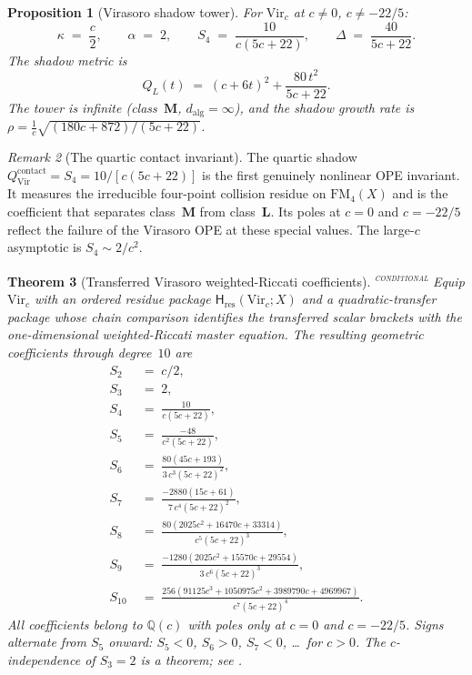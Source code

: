 \documentclass[11pt,reqno]{amsart}
\newtheorem{theorem}{Theorem}[section]
\newtheorem{proposition}[theorem]{Proposition}
\theoremstyle{definition}
\theoremstyle{remark}
\newtheorem{remark}[theorem]{Remark}
\newcommand{\FM}{\mathrm{FM}}
\newcommand{\Vir}{\mathrm{Vir}}
\providecommand{\ClaimStatusConditional}{\textsuperscript{\textsc{conditional}}}
\numberwithin{equation}{section}
\begin{document}
\begin{proposition}[Virasoro shadow
tower]\label{prop:virasoro}
For $\Vir_c$ at $c \ne 0$, $c \ne -22/5$:
\[
 \kappa \;=\; \frac{c}{2},
 \qquad
 \alpha \;=\; 2,
 \qquad
 S_4 \;=\; \frac{10}{c(5c+22)},
 \qquad
 \Delta \;=\; \frac{40}{5c+22}.
\]
The shadow metric is
\[
 Q_L(t)
 \;=\;
 (c + 6t)^2 + \frac{80\, t^2}{5c + 22}.
\]
The tower is infinite (class~$\mathbf{M}$,
$d_{\mathrm{alg}} = \infty$), and the shadow growth rate is
$\rho = \frac{1}{c}\sqrt{(180c + 872)/(5c+22)}$.
\end{proposition}

\begin{remark}[The quartic contact
invariant]\label{rem:quartic-contact}
The quartic shadow
$Q^{\mathrm{contact}}_{\Vir} = S_4 = 10/[c(5c+22)]$ is
the first genuinely nonlinear OPE invariant. It measures
the irreducible four-point collision residue on $\FM_4(X)$
and is the coefficient that separates class~$\mathbf{M}$
from class~$\mathbf{L}$. Its poles at $c = 0$ and
$c = -22/5$ reflect the failure of the Virasoro OPE at
these special values. The large-$c$ asymptotic is
$S_4 \sim 2/c^2$.
\end{remark}

\begin{theorem}[Transferred Virasoro weighted-Riccati
coefficients]\label{thm:virasoro-coefficients}
\ClaimStatusConditional
Equip $\Vir_c$ with an ordered residue package
$\mathsf H_{\mathrm{res}}(\Vir_c;X)$ and a quadratic-transfer package
whose chain comparison identifies the transferred scalar brackets with
the one-dimensional weighted-Riccati master equation.  The resulting
geometric coefficients through degree~$10$ are
\begin{align*}
 S_2 &\;=\; c/2, \\[3pt]
 S_3 &\;=\; 2, \\[3pt]
 S_4 &\;=\; \frac{10}{c(5c+22)}, \\[3pt]
 S_5 &\;=\; \frac{-48}{c^2(5c+22)}, \\[3pt]
 S_6 &\;=\; \frac{80(45c+193)}{3\,c^3(5c+22)^2}, \\[3pt]
 S_7 &\;=\;
 \frac{-2880(15c+61)}{7\,c^4(5c+22)^2}, \\[3pt]
 S_8 &\;=\;
 \frac{80(2025c^2+16470c+33314)}{c^5(5c+22)^3}, \\[3pt]
 S_9 &\;=\;
 \frac{-1280(2025c^2+15570c+29554)}
 {3\,c^6(5c+22)^3}, \\[3pt]
 S_{10} &\;=\;
 \frac{256(91125c^3+1050975c^2+3989790c+4969967)}
 {c^7(5c+22)^4}.
\end{align*}
All coefficients belong to $\mathbb{Q}(c)$ with poles
only at $c = 0$ and $c = -22/5$. Signs alternate from
$S_5$ onward: $S_5 < 0$, $S_6 > 0$, $S_7 < 0$, \ldots\
for $c > 0$.
The $c$-independence of $S_3 = 2$ is a theorem; see
\cite{LorgatVirR}.
\end{theorem}
\end{document}
